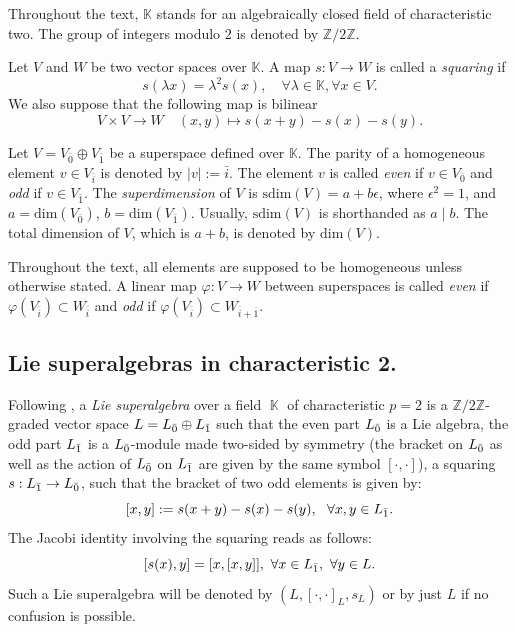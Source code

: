 \documentclass[12pt]{amsart}
\DeclareMathOperator{\K}{\mathbb{K}}
\newcommand{\Z}{\mathbb{Z}}
\begin{document}
Throughout the text, $\mathbb{K}$ stands for an algebraically closed field of characteristic two. The group of integers modulo $2$ is denoted by $\Z/2\Z$. 

Let $V$ and $W$ be two vector spaces over $\mathbb{K}$. A map $s : V \to W$ is called a \textit{squaring} if
\[ s(\lambda x) = \lambda^2 s(x), \quad \forall \lambda \in \mathbb{K}, \forall x \in V. \]
We also suppose that the following map is bilinear
\[ V \times V \to W \quad (x, y) \mapsto s(x + y) - s(x) - s(y). \]

 Let $V=V_{\bar 0}\oplus V_{\bar 1}$ be a superspace defined over ${\mathbb K}$. The parity of a homogeneous element $v\in V_{\bar{i}}$ is denoted by $|v|:=\bar{i}$. The element $v$ is called \textit{even} if $v\in V_{\bar 0}$ and \textit{odd} if $v\in V_{\bar 1}$. The {\it superdimension} of $V$ is $\mathrm{sdim}(V)=a+b\epsilon$, where $\epsilon^2=1$, and $a=\mathrm{dim}(V_{\bar 0})$, $b=\mathrm{dim}(V_{\bar 1})$. Usually, $\mathrm{sdim}(V)$ is shorthanded as $a\mid b$. The total dimension of $V$, which is $a+b$, is denoted by  $\mathrm{dim}(V)$.  
 
 Throughout the text, all elements are supposed to be homogeneous unless otherwise stated. A linear map $\varphi:V\rightarrow W$ between superspaces is called \textit{even} if $\varphi(V_{\bar{i}})\subset W_{\bar{i}}$ and \textit{odd} if $\varphi(V_{\bar{i}})\subset W_{\overline{i}+\overline{1}}$.

\vspace{0.5 em}

\subsection{Lie superalgebras in characteristic 2.}\label{deflsa}

Following \cite{BMY,LeD}, a \emph{Lie superalgebra} over a field $\K$ of characteristic $p=2$ is a $\Z/2\Z$-graded vector space $L=L_{{\bar0}}\oplus L_{{\bar1}}$ such that the even part $L_{{\bar0}}$ is a Lie algebra, the odd part $L_{{\bar1}}$ is a $L_{{\bar0}}$-module made two-sided by symmetry (the bracket on $L_{{\bar0}}$ as well as the action of $L_{{\bar0}}$ on $L_{{\bar1}}$ are given by the same symbol $[\cdot, \cdot]$), a squaring  $s:L_{{\bar1}}\rightarrow L_{{\bar0}}$, such that the bracket of two odd elements is given by:
    \begin{equation}\label{bil}
        [x,y]:=s(x+y)-s(x)-s(y),~~ \forall x,y\in L_{{\bar1}}.
    \end{equation} 
The Jacobi identity involving the squaring reads as follows: 
    \begin{equation}\label{jacobsq} 
        [s(x),y]=[x,[x,y]],~\forall x\in L_{{\bar1}},~\forall y\in L.    \end{equation}
Such a Lie superalgebra will be denoted by $\left(L,[\cdot,\cdot]_L,s_L\right)$ or by just $L$ if no confusion is possible.
\end{document}
